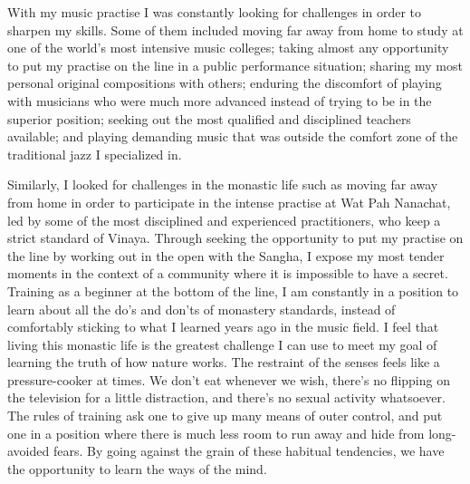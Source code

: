 With my music practise I was constantly looking for challenges in order
to sharpen my skills. Some of them included moving far away from home to
study at one of the world's most intensive music colleges; taking almost
any opportunity to put my practise on the line in a public performance
situation; sharing my most personal original compositions with others; 
enduring the discomfort of playing with musicians who were much more
advanced instead of trying to be in the superior position; seeking out
the most qualified and disciplined teachers available; and playing
demanding music that was outside the comfort zone of the traditional
jazz I specialized in. 

Similarly, I looked for challenges in the monastic life such as moving
far away from home in order to participate in the intense practise at
Wat Pah Nanachat, led by some of the most disciplined and experienced
practitioners, who keep a strict standard of Vinaya. Through seeking the
opportunity to put my practise on the line by working out in the open
with the Sangha, I expose my most tender moments in the context of a
community where it is impossible to have a secret. Training as a
beginner at the bottom of the line, I am constantly in a position to
learn about all the do's and don'ts of monastery standards, instead of
comfortably sticking to what I learned years ago in the music field. I
feel that living this monastic life is the greatest challenge I can use
to meet my goal of learning the truth of how nature works. The restraint
of the senses feels like a pressure-cooker at times. We don't eat
whenever we wish, there's no flipping on the television for a little
distraction, and there's no sexual activity whatsoever. The rules of
training ask one to give up many means of outer control, and put one in
a position where there is much less room to run away and hide from
long-avoided fears. By going against the grain of these habitual
tendencies, we have the opportunity to learn the ways of the mind. 

